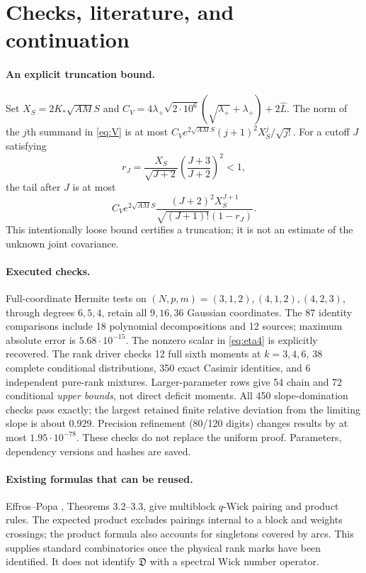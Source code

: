 \documentclass[11pt]{article}
\newcommand{\DD}{\mathfrak D}
\begin{document}
\newpage
\section{Checks, literature, and continuation}
\paragraph{An explicit truncation bound.}
Set $X_S=2K_*\sqrt{AM}S$ and
$C_V=4\lambda_+\sqrt{2\cdot10^6}(\sqrt{\lambda_+}+\lambda_+)+2\widehat L$.
The norm of the $j$th summand in \eqref{eq:V} is at most
$C_Ve^{2\sqrt{AM}S}(j+1)^2X_S^j/\sqrt{j!}$.
For a cutoff $J$ satisfying
\begin{equation}
 r_J=\frac{X_S}{\sqrt{J+2}}\left(\frac{J+3}{J+2}\right)^2<1,
\end{equation}
the tail after $J$ is at most
\begin{equation}
 C_Ve^{2\sqrt{AM}S}
 \frac{(J+2)^2X_S^{J+1}}{\sqrt{(J+1)!}(1-r_J)}.
\end{equation}
This intentionally loose bound certifies a truncation; it is not
an estimate of the unknown joint covariance.

\paragraph{Executed checks.}
Full-coordinate Hermite tests on $(N,p,m)=(3,1,2),(4,1,2),(4,2,3)$,
through degrees $6,5,4$, retain all $9,16,36$ Gaussian coordinates.
The 87 identity comparisons include 18 polynomial decompositions and
12 sources; maximum absolute error is $5.68\cdot10^{-15}$.
The nonzero scalar in \eqref{eq:eta4} is explicitly recovered.
The rank driver checks 12 full sixth moments at $k=3,4,6$, 38 complete
conditional distributions, 350 exact Casimir identities, and 6 independent
pure-rank mixtures. Larger-parameter rows give 54 chain and 72 conditional
\emph{upper bounds}, not direct deficit moments. All 450 slope-domination
checks pass exactly; the largest retained finite relative deviation from
the limiting slope is about $0.929$. Precision refinement (80/120 digits)
changes results by at most $1.95\cdot10^{-78}$. These checks do not replace
the uniform proof. Parameters, dependency versions and hashes are saved.

\paragraph{Existing formulas that can be reused.}
Effros--Popa \cite{EP}, Theorems 3.2--3.3, give multiblock $q$-Wick
pairing and product rules. The expected product excludes pairings
internal to a block and weights crossings; the product formula also
accounts for singletons covered by arcs. This supplies standard
combinatorics once the physical rank marks have been identified.
It does not identify $\DD$ with a spectral Wick number operator.
\end{document}
